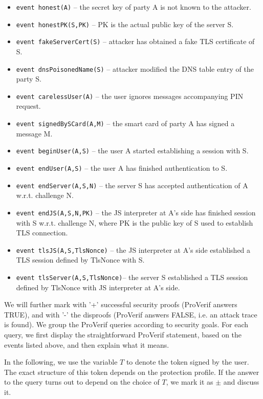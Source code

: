\begin{itemize}
\item \texttt{event honest(A)} -- the secret key of party A is not known to the attacker.
\item \texttt{event honestPK(S,PK)} -- PK is the actual public key of the server S.

\item \texttt{event fakeServerCert(S)} -- attacker has obtained a fake TLS certificate of S.
\item \texttt{event dnsPoisonedName(S)} -- attacker modified the DNS table entry of the party S.
\item \texttt{event carelessUser(A)} -- the user ignores messages accompanying PIN request.

\item \texttt{event signedBySCard(A,M)} -- the smart card of party A has signed a message M.

\item \texttt{event beginUser(A,S)} -- the user A started establishing a session with S.
\item \texttt{event endUser(A,S)}   -- the user A has finished authentication to S.

\item \texttt{event endServer(A,S,N)} -- the server S has accepted authentication of A w.r.t. challenge N.
\item \texttt{event endJS(A,S,N,PK)} -- the JS interpreter at A's side has finished session with S w.r.t. challenge N, where PK is the public key of S used to establish TLS connection.

\item \texttt{event tlsJS(A,S,TlsNonce)} -- the JS interpreter at A's side established a TLS session defined by TlsNonce with S.
\item \texttt{event tlsServer(A,S,TlsNonce)}-- the server S established a TLS session defined by TlsNonce with JS interpreter at A's side.
\end{itemize}


We will further mark with '+' successful security proofs (ProVerif answers TRUE), and with '-' the disproofs (ProVerif answers FALSE, i.e. an attack trace is found). We group the ProVerif queries according to security goals. For each query, we first display the straightforward ProVerif statement, based on the events listed above, and then explain what it means.

In the following, we use the variable $T$ to denote the token signed by the user. The exact structure of this token depends on the protection profile. If the answer to the query turns out to depend on the choice of $T$, we mark it as $\pm$ and discuss it.


